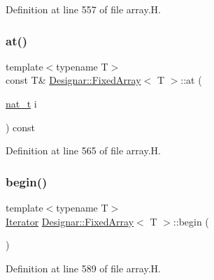 Definition at line 557 of file array.\+H.

\mbox{\label{class_designar_1_1_fixed_array_a3a1dec650628273bf08b6656db0a9088}} 
\subsubsection{\texorpdfstring{at()}{at()}\hspace{0.1cm}{\footnotesize\ttfamily [2/2]}}
{\footnotesize\ttfamily template$<$typename T$>$ \\
const T\& \hyperlink{class_designar_1_1_fixed_array}{Designar\+::\+Fixed\+Array}$<$ T $>$\+::at (\begin{DoxyParamCaption}\item[{\hyperlink{namespace_designar_aa72662848b9f4815e7bf31a7cf3e33d1}{nat\+\_\+t}}]{i }\end{DoxyParamCaption}) const\hspace{0.3cm}{\ttfamily [inline]}}



Definition at line 565 of file array.\+H.

\mbox{\label{class_designar_1_1_fixed_array_a40c099038e41c839acca94bf352753fc}} 
\subsubsection{\texorpdfstring{begin()}{begin()}\hspace{0.1cm}{\footnotesize\ttfamily [1/2]}}
{\footnotesize\ttfamily template$<$typename T$>$ \\
\hyperlink{class_designar_1_1_fixed_array_1_1_iterator}{Iterator} \hyperlink{class_designar_1_1_fixed_array}{Designar\+::\+Fixed\+Array}$<$ T $>$\+::begin (\begin{DoxyParamCaption}{ }\end{DoxyParamCaption})\hspace{0.3cm}{\ttfamily [inline]}}



Definition at line 589 of file array.\+H.

\mbox{\label{class_designar_1_1_fixed_array_afeedbafa8456c56f80716466191810d6}} 
